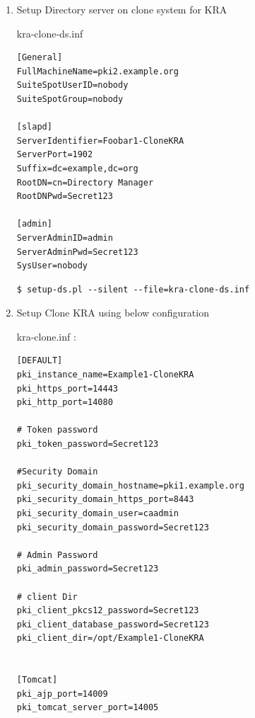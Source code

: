 \documentclass[a4paper]{article}
\begin{document}
\begin{enumerate}[label*=\arabic*.]
\begin{enumerate}[label*=\arabic*.]
\begin{enumerate}[label*=\arabic*.]
                        \item Setup Directory server on clone system for KRA

                            kra-clone-ds.inf
                            \begin{lstlisting}[style=configFile]
[General]
FullMachineName=pki2.example.org
SuiteSpotUserID=nobody
SuiteSpotGroup=nobody

[slapd]
ServerIdentifier=Foobar1-CloneKRA
ServerPort=1902
Suffix=dc=example,dc=org
RootDN=cn=Directory Manager
RootDNPwd=Secret123

[admin]
ServerAdminID=admin
ServerAdminPwd=Secret123
SysUser=nobody
                            \end{lstlisting}
                            \begin{lstlisting}[style=bashInputStyle]
$ setup-ds.pl --silent --file=kra-clone-ds.inf
                            \end{lstlisting}
                        \item Setup Clone KRA using below configuration
                            
                            kra-clone.inf :
                            \begin{lstlisting}[style=configFile]
[DEFAULT]
pki_instance_name=Example1-CloneKRA
pki_https_port=14443
pki_http_port=14080

# Token password
pki_token_password=Secret123

#Security Domain
pki_security_domain_hostname=pki1.example.org
pki_security_domain_https_port=8443
pki_security_domain_user=caadmin
pki_security_domain_password=Secret123

# Admin Password
pki_admin_password=Secret123

# client Dir
pki_client_pkcs12_password=Secret123
pki_client_database_password=Secret123
pki_client_dir=/opt/Example1-CloneKRA


[Tomcat]
pki_ajp_port=14009
pki_tomcat_server_port=14005


\end{lstlisting}
\end{enumerate}
\end{enumerate}
\end{enumerate}
\end{document}
